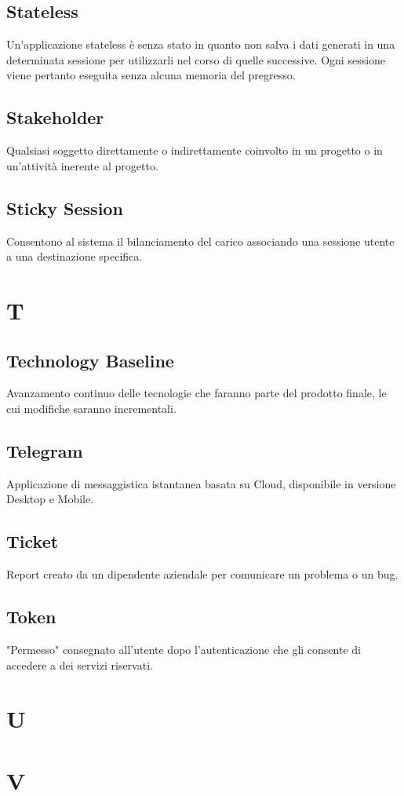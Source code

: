 \subsection{Stateless}
Un’applicazione stateless è senza stato in quanto non salva i dati generati in una determinata sessione per utilizzarli nel corso di quelle successive. Ogni sessione viene pertanto eseguita senza alcuna memoria del pregresso.
\subsection{Stakeholder}
Qualsiasi soggetto direttamente o indirettamente coinvolto in un progetto o in un'attività inerente al progetto.
\subsection{Sticky Session}
Consentono al sistema il bilanciamento del carico associando una sessione utente a una destinazione specifica.
\newpage
\section{T}
\subsection{Technology Baseline}
Avanzamento continuo delle tecnologie che faranno parte del prodotto finale, le cui modifiche saranno incrementali.
\subsection{Telegram}
Applicazione di messaggistica istantanea basata su Cloud, disponibile in versione Desktop e Mobile.
\subsection{Ticket}
Report creato da un dipendente aziendale per comunicare un problema o un bug.
\subsection{Token}  
"Permesso" consegnato all'utente dopo l'autenticazione che gli consente di accedere a dei servizi riservati.
\newpage
\section{U}
\section{V}
